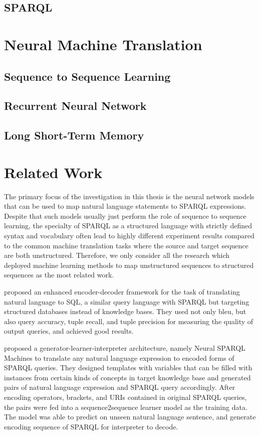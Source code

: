 \subsection{SPARQL} \label{subsection:sparql}


\section{Neural Machine Translation} \label{section:neural machine translation}

\subsection{Sequence to Sequence Learning}


\subsection{Recurrent Neural Network}


\subsection{Long Short-Term Memory}


\section{Related Work} \label{section:related work}

The primary focus of the investigation in this thesis is the neural network models that can be used to map natural language statements to SPARQL expressions. Despite that such models usually just perform the role of sequence to sequence learning, the specialty of SPARQL as a structured language with strictly defined syntax and vocabulary often lead to highly different experiment results compared to the common machine translation tasks where the source and target sequence are both unstructured. Therefore, we only consider all the research which deployed machine learning methods to map unstructured sequences to structured sequences as the most related work.

\cite{Cai2017} proposed an enhanced encoder-decoder framework for the task of translating natural language to SQL, a similar query language with SPARQL but targeting structured databases instead of knowledge bases. They used not only bleu, but also query accuracy, tuple recall, and tuple precision for measuring the quality of output queries, and achieved good results.

\cite{Soru2018a,Soru2018} proposed a generator-learner-interpreter architecture, namely Neural SPARQL Machines to translate any natural language expression to encoded forms of SPARQL queries. They designed templates with variables that can be filled with instances from certain kinds of concepts in target knowledge base and generated pairs of natural language expression and SPARQL query accordingly. After encoding operators, brackets, and URIs contained in original SPARQL queries, the pairs were fed into a sequence2sequence learner model as the training data. The model was able to predict on unseen natural language sentence, and generate encoding sequence of SPARQL for interpreter to decode. 
